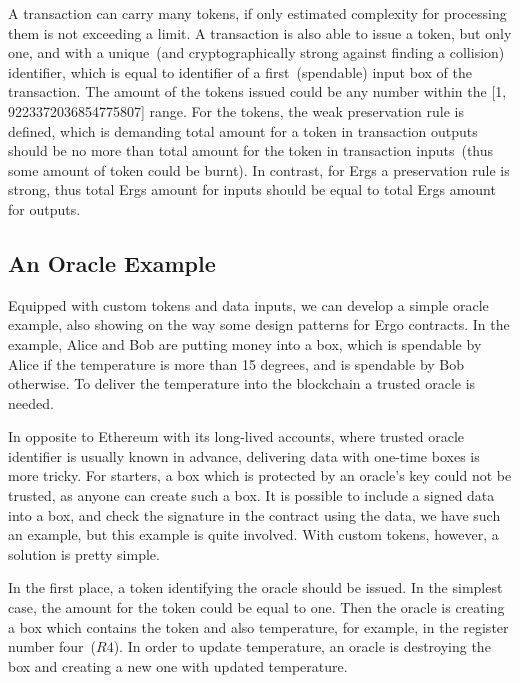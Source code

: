  A transaction can carry many tokens, if only estimated complexity for processing them is not exceeding a limit. A
 transaction is also able to issue a token, but only one, and with a unique~(and cryptographically strong against
 finding a collision) identifier, which is equal to identifier of a first~(spendable) input box of the transaction.
 The amount of the tokens issued could be any number within the [1, 9223372036854775807] range. For the tokens, the weak
 preservation rule is defined, which is demanding total amount for a token in transaction outputs should be no more
 than total amount for the token in transaction inputs~(thus some amount of token could be burnt). In contrast, for Ergs
 a preservation rule is strong, thus total Ergs amount for inputs should be equal to total Ergs amount for outputs.

\subsection{An Oracle Example}
 \label{sec:platform}


 Equipped with custom tokens and data inputs, we can develop a simple oracle example, also showing on the way some
 design patterns for Ergo contracts. In the example, Alice and Bob are putting money into a box, which is spendable by
 Alice if the temperature is more than 15 degrees, and is spendable by Bob otherwise. To deliver the temperature into the
 blockchain a trusted oracle is needed.

 In opposite to Ethereum with its long-lived accounts, where trusted oracle identifier is usually known in advance,
 delivering data with one-time boxes is more tricky. For starters, a box which is protected by an oracle's key could
 not be trusted, as anyone can create such a box. It is possible to include a signed data into a box, and check the
 signature in the contract using the data, we have such an example, but this example is quite involved. With custom
 tokens, however, a solution is pretty simple.

 In the first place, a token identifying the oracle should be issued. In the simplest case, the amount for the token could
 be equal to one. Then the oracle is creating a box which contains the token and also temperature, for example, in the
 register number four~($R4$). In order to update temperature, an oracle is destroying the box and creating a
 new one with updated temperature.

